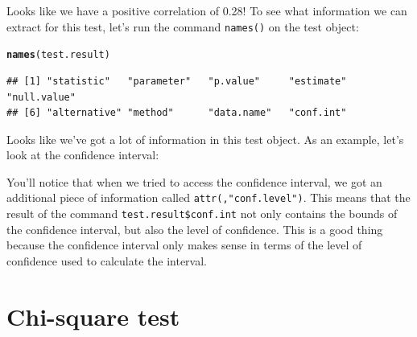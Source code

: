 \documentclass{tufte-book}\usepackage[]{graphicx}\usepackage[]{color}
\makeatletter
\newcommand{\hlopt}[1]{\textcolor[rgb]{0,0,0}{#1}}%
\newcommand{\hlstd}[1]{\textcolor[rgb]{0.345,0.345,0.345}{#1}}%
\newcommand{\hlkwd}[1]{\textcolor[rgb]{0.737,0.353,0.396}{\textbf{#1}}}%
\newenvironment{kframe}{%
 \def\at@end@of@kframe{}%
 \ifinner\ifhmode%
  \def\at@end@of@kframe{\end{minipage}}%
  \begin{minipage}{\columnwidth}%
 \fi\fi%
 \def\FrameCommand##1{\hskip\@totalleftmargin \hskip-\fboxsep
 \colorbox{shadecolor}{##1}\hskip-\fboxsep
     \hskip-\linewidth \hskip-\@totalleftmargin \hskip\columnwidth}%
 \MakeFramed {\advance\hsize-\width
   \@totalleftmargin\z@ \linewidth\hsize
   \@setminipage}}%
 {\par\unskip\endMakeFramed%
 \at@end@of@kframe}
\newenvironment{knitrout}{}{} %
\makeatother
\begin{document}
\begin{footnotesize}
Looks like we have a positive correlation of 0.28! To see what information we can extract for this test, let's run the command \texttt{names()} on the test object:

\begin{footnotesize}
\begin{knitrout}
\color{fgcolor}\begin{kframe}
\begin{alltt}
\hlkwd{names}\hlstd{(test.result)}
\end{alltt}
\begin{verbatim}
## [1] "statistic"   "parameter"   "p.value"     "estimate"    "null.value" 
## [6] "alternative" "method"      "data.name"   "conf.int"
\end{verbatim}
\end{kframe}
\end{knitrout}
\end{footnotesize}

Looks like we've got a lot of information in this test object. As an example, let's look at the confidence interval:


You'll notice that when we tried to access the confidence interval, we got an additional piece of information called \texttt{attr(,"conf.level")}. This means that the result of the command \texttt{test.result\$conf.int} not only contains the bounds of the confidence interval, but also the level of confidence. This is a good thing because the confidence interval only makes sense in terms of the level of confidence used to calculate the interval.

\section{Chi-square test}


\end{footnotesize}
\end{document}
